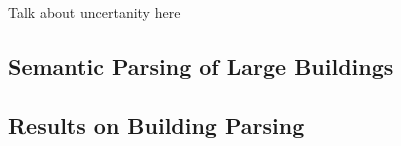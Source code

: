 Talk about uncertanity here










\subsection{Semantic Parsing of Large Buildings}
\subsection{Results on Building Parsing}
